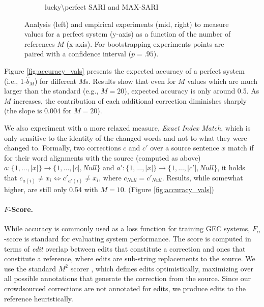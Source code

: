 \documentclass[11pt, a4paper]{article}
\begin{document}
\begin{figure}
\begin{subfigure}[]{0.65\columnwidth}
		\caption{
			lucky\textbackslash perfect SARI and MAX-SARI\label{fig:SARI_Ms}}
	\end{subfigure}
	\caption{Analysis (left) and empirical experiments (mid, right) to measure values for a perfect system (y-axis)
		as a function of the number of references $M$ (x-axis). For bootstrapping experiments points are paired with a confidence interval ($p=.95$).}
\end{figure}

Figure \ref{fig:accuracy_vals} presents the expected accuracy of a perfect
system (i.e., 1-$\hat{b}_M$) for different  $M$s. 
Results show that even for $M$ values which are much larger than the standard (e.g., $M=20$),
expected accuracy is only around 0.5. As $M$ increases, the contribution of each additional correction 
diminishes sharply (the slope is 0.004 for $M=20$).

We also experiment with a more relaxed measure, {\it Exact Index Match}, which is only sensitive to the identity of the changed words and not to what they were changed to. 
Formally, two corrections $c$ and $c'$ over a source sentence $x$ match if for their word alignments with the source (computed as above) $a:\{1,...,\left|x\right|\} \rightarrow \{1,...,\left|c\right|,Null\}$
and $a':\{1,...,\left|x\right|\} \rightarrow \{1,...,\left|c'\right|,Null\}$, it holds that $c_{a\left(i\right)} \neq x_{i} \Leftrightarrow c'_{a'\left(i\right)} \neq x_{i}$, where $c_{Null}=c'_{Null}$.
Results, while somewhat higher, are still only 0.54 with $M=10$. (Figure \ref{fig:accuracy_vals})

\paragraph{$F$-Score.}
While accuracy is commonly used as a loss function for training GEC systems,
$F_\alpha$-score is standard for evaluating system performance.
The score is computed in terms of {\it edit} overlap between edits that constitute a correction and ones that constitute a reference, where edits are sub-string replacements to the source.
We use the standard $M^2$ scorer \cite{dahlmeier2012better}, which defines edits optimistically, maximizing over all possible annotations that generate the correction 
from the source. Since our crowdsourced corrections are not annotated for edits, we produce edits to the reference heuristically.
\end{document}
